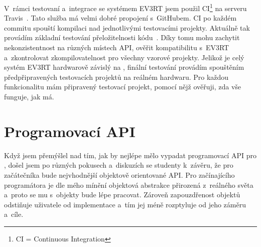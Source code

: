 V~rámci testovaní a~integrace se systémem EV3RT jsem použil CI\footnote{CI = Continuous Integration} na serveru Travis~\cite{Travis-web}.
% 
% 
Tato služba má velmi dobré propojení s~GitHubem. 
CI po každém commitu spouští kompilaci nad jednotlivými testovacími projekty.
Aktuálně tak provádím základní testování přeložitelnosti kódu~\cite{Travis-RB-ev3rt-hrp2-sdk}.
Díky tomu mohu zachytit nekonzistentnost na různých místech API, ověřit kompatibilitu s~EV3RT a~zkontrolovat zkompilovatelnost pro všechny vzorové projekty.  
Jelikož je celý systém EV3RT hardwarově závislý na \legoEV{}, finální testování provádím spouštěním předpřipravených testovacích projektů na reálném hardwaru.
% 
% 
%
%
% 
% 
%
%
Pro každou funkcionalitu mám připravený testovací projekt, pomocí nějž ověřuji, zda vše funguje, jak má.
% 
% 


\section{Programovací API}
% 
% 
%
%
%
%
%
%

Když jsem přemýšlel nad tím, jak by nejlépe mělo vypadat programovací API pro \lego{}, došel jsem po různých pokusech a~diskuzích se studenty k~závěru, že pro začátečníka bude nejvhodnější objektově orientované API.
Pro začínajícího programátora je dle mého mínění objektová abstrakce přirozená z~reálného světa a~proto se mu s~objekty bude lépe pracovat.
Zároveň zapouzdřenost objektů odstiňuje uživatele od implementace a~tím jej méně rozptyluje od jeho záměru a~cíle.

